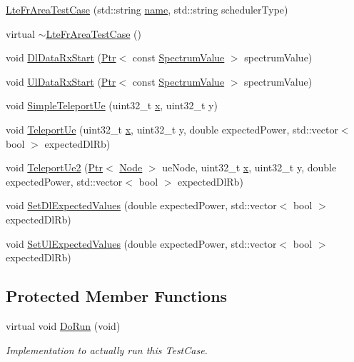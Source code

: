 \begin{DoxyCompactItemize}
\item 
\hyperlink{classLteFrAreaTestCase_a0687abbf4a200d2392f56d8433f754b3}{Lte\+Fr\+Area\+Test\+Case} (std\+::string \hyperlink{generate__test__data__lte__spectrum__model_8m_ab74e6bf80237ddc4109968cedc58c151}{name}, std\+::string scheduler\+Type)
\item 
virtual \hyperlink{classLteFrAreaTestCase_a3fcec949295cf618945a85067c228441}{$\sim$\+Lte\+Fr\+Area\+Test\+Case} ()
\item 
void \hyperlink{classLteFrAreaTestCase_a7f80e2da86bd1c944ded59a943c8aac9}{Dl\+Data\+Rx\+Start} (\hyperlink{classns3_1_1Ptr}{Ptr}$<$ const \hyperlink{classns3_1_1SpectrumValue}{Spectrum\+Value} $>$ spectrum\+Value)
\item 
void \hyperlink{classLteFrAreaTestCase_a711a5d4976fbcfe16a6c4a53a28d179f}{Ul\+Data\+Rx\+Start} (\hyperlink{classns3_1_1Ptr}{Ptr}$<$ const \hyperlink{classns3_1_1SpectrumValue}{Spectrum\+Value} $>$ spectrum\+Value)
\item 
void \hyperlink{classLteFrAreaTestCase_a1dbe5efa7a5cd74cc28d3eeaace73395}{Simple\+Teleport\+Ue} (uint32\+\_\+t \hyperlink{lte__link__budget__x2__handover__measures_8m_a9336ebf25087d91c818ee6e9ec29f8c1}{x}, uint32\+\_\+t y)
\item 
void \hyperlink{classLteFrAreaTestCase_ad644210c338d4e34da3c5d7f0c511269}{Teleport\+Ue} (uint32\+\_\+t \hyperlink{lte__link__budget__x2__handover__measures_8m_a9336ebf25087d91c818ee6e9ec29f8c1}{x}, uint32\+\_\+t y, double expected\+Power, std\+::vector$<$ bool $>$ expected\+Dl\+Rb)
\item 
void \hyperlink{classLteFrAreaTestCase_a726ebada64f79768017f64e39b4f22e3}{Teleport\+Ue2} (\hyperlink{classns3_1_1Ptr}{Ptr}$<$ \hyperlink{classns3_1_1Node}{Node} $>$ ue\+Node, uint32\+\_\+t \hyperlink{lte__link__budget__x2__handover__measures_8m_a9336ebf25087d91c818ee6e9ec29f8c1}{x}, uint32\+\_\+t y, double expected\+Power, std\+::vector$<$ bool $>$ expected\+Dl\+Rb)
\item 
void \hyperlink{classLteFrAreaTestCase_acda21c5ba5423468d4556a1968f624e5}{Set\+Dl\+Expected\+Values} (double expected\+Power, std\+::vector$<$ bool $>$ expected\+Dl\+Rb)
\item 
void \hyperlink{classLteFrAreaTestCase_aac2718dc3703d2ad389f88ffa20d035e}{Set\+Ul\+Expected\+Values} (double expected\+Power, std\+::vector$<$ bool $>$ expected\+Dl\+Rb)
\end{DoxyCompactItemize}
\subsection*{Protected Member Functions}
\begin{DoxyCompactItemize}
\item 
virtual void \hyperlink{classLteFrAreaTestCase_a238d20569ef61122d065243d3c3860f3}{Do\+Run} (void)
\begin{DoxyCompactList}\small\item\em Implementation to actually run this Test\+Case. \end{DoxyCompactList}\end{DoxyCompactItemize}
